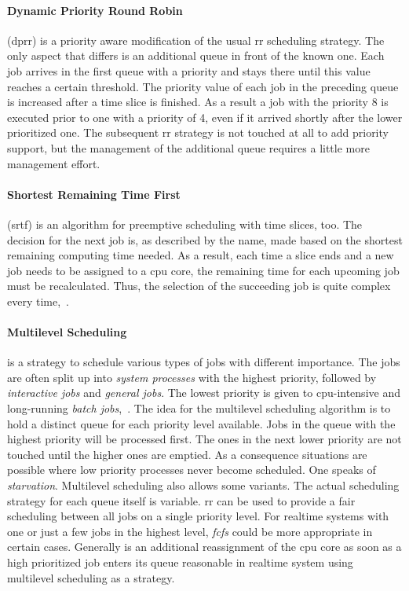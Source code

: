 \paragraph{Dynamic Priority Round Robin}
(\ac{dprr}) is a priority aware modification of the usual \ac{rr} scheduling strategy.
The only aspect that differs is an additional queue in front of the known one.
Each job arrives in the first queue with a priority and stays there until this value reaches a certain threshold.
The priority value of each job in the preceding queue is increased after a time slice is finished.
As a result a job with the priority 8 is executed prior to one with a priority of 4, even if it arrived shortly after the lower prioritized one.
The subsequent \ac{rr} strategy is not touched at all to add priority support, but the management of the additional queue requires a little more management effort\cite{brause2017betriebssysteme}.

\paragraph{Shortest Remaining Time First}
(\ac{srtf}) is an algorithm for preemptive scheduling with time slices, too.
The decision for the next job is, as described by the name, made based on the shortest remaining computing time needed.
As a result, each time a slice ends and a new job needs to be assigned to a \ac{cpu} core, the remaining time for each upcoming job must be recalculated. 
Thus, the selection of the succeeding job is quite complex every time\cite{brause2017betriebssysteme},~\cite{glatz2015betriebssysteme}.

\paragraph{Multilevel Scheduling}
is a strategy to schedule various types of jobs with different importance.
The jobs are often split up into \textit{system processes} with the highest priority, followed by \textit{interactive jobs} and \textit{general jobs}. 
The lowest priority is given to \ac{cpu}-intensive and long-running \textit{batch jobs}\cite{brause2017betriebssysteme},~\cite{mandl2014Grundkurs}.
The idea for the multilevel scheduling algorithm is to hold a distinct queue for each priority level available.
Jobs in the queue with the highest priority will be processed first. 
The ones in the next lower priority are not touched until the higher ones are emptied.
As a consequence situations are possible where low priority processes never become scheduled.
One speaks of \textit{starvation}\cite{glatz2015betriebssysteme}.
Multilevel scheduling also allows some variants.
The actual scheduling strategy for each queue itself is variable.
\ac{rr} can be used to provide a fair scheduling between all jobs on a single priority level.
For realtime systems with one or just a few jobs in the highest level, \textit{\ac{fcfs}} could be more appropriate in certain cases.
Generally is an additional reassignment of the \ac{cpu} core as soon as a high prioritized job enters its queue reasonable in realtime system using multilevel scheduling as a strategy\cite{glatz2015betriebssysteme}.

